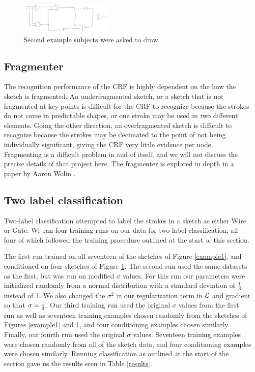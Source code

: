 \documentclass[10pt]{acmsiggraph}               %
\begin{document}
\begin{figure}[h]
\centering
\includegraphics[width=1.8in]{example2.png}
\caption{Second example subjects were asked to draw.}
\label{example2}
\end{figure}

\subsection{Fragmenter}
The recognition performance of the CRF is highly dependent on the how the sketch is fragmented. An underfragmented sketch, or a sketch that is not fragmented at key points is difficult for the CRF to recognize because the strokes do not come in predictable shapes, or one stroke may be used in two different elements.  Going the other direction, an overfragmented sketch is difficult to recognize because the strokes may be decimated to the point of not being individually significant, giving the CRF very little evidence per node.  Fragmenting is a difficult problem in and of itself, and we will not discuss the precise details of that project here.  The fragmenter is explored in depth in a paper by Aaron Wolin \cite{wolin:fragmenter}.

\subsection{Two label classification}
Two-label classification attempted to label the strokes in a sketch as
either Wire or Gate.  We ran four training runs on our data for
two-label classification, all four of which followed the training
procedure outlined at the start of this section.

The first run trained on all seventeen of the sketches of Figure
\ref{example1}, and conditioned on four sketches of Figure
\ref{example2}.  The second run used the same datasets as the first,
but was run on modified $\sigma$ values.  For this run our parameters
were initialized randomly from a normal distribution with a standard
deviation of ${1 \over 3}$ instead of 1.  We also changed the
$\sigma^2$ in our regularization term in $\cal L$ and gradient so that
$\sigma = {1 \over 3}$.  Our third training run used the original
$\sigma$ values from the first run as well as seventeen training
examples chosen randomly from the sketches of Figures \ref{example1}
and \ref{example2}, and four conditioning examples chosen similarly.
Finally, our fourth run used the original $\sigma$ values.  Seventeen
training examples were chosen randomly from all of the sketch data,
and four conditioning examples were chosen similarly.  Running
classification as outlined at the start of the section gave us the
results seen in Table \ref{results}.
\end{document}
